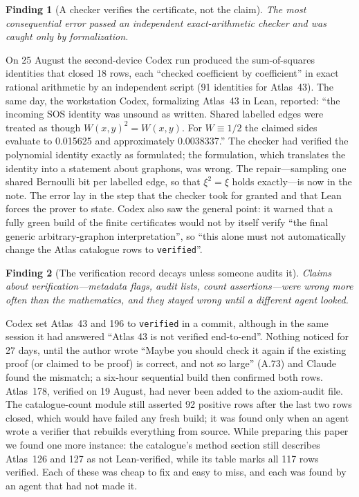 \documentclass[11pt,a4paper]{article}
\newtheorem{finding}{Finding}
\newcommand{\ttt}[1]{\texttt{#1}}
\begin{document}
\begin{finding}[A checker verifies the certificate, not the claim]\label{f:checker}
The most consequential error passed an independent exact-arithmetic checker and was caught only by
formalization.
\end{finding}
On 25 August the second-device Codex run produced the sum-of-squares identities that closed 18 rows, each
``checked coefficient by coefficient'' in exact rational arithmetic by an independent script (91 identities for
Atlas~43). The same day, the workstation Codex, formalizing Atlas~43 in Lean, reported: ``the incoming SOS
identity was unsound as written. Shared labelled edges were treated as though $W(x,y)^2 = W(x,y)$. For $W\equiv
1/2$ the claimed sides evaluate to 0.015625 and approximately 0.0038337.'' The checker had verified the
polynomial identity exactly as formulated; the formulation, which translates the identity into a statement
about graphons, was wrong. The repair---sampling one shared Bernoulli bit per labelled edge, so that
$\xi^2=\xi$ holds exactly---is now in the note. The error lay in the step that the checker took for granted and
that Lean forces the prover to state. Codex also saw the general point: it warned that a fully green build of
the finite certificates would not by itself verify ``the final generic arbitrary-graphon interpretation'', so
``this alone must not automatically change the Atlas catalogue rows to \ttt{verified}''.

\begin{finding}[The verification record decays unless someone audits it]\label{f:record}
Claims \emph{about} verification---metadata flags, audit lists, count assertions---were wrong more often
than the mathematics, and they stayed wrong until a different agent looked.
\end{finding}
Codex set Atlas~43 and 196 to \ttt{verified} in a commit, although in the same session it had answered
``Atlas 43 is not verified end-to-end''. Nothing noticed for 27 days, until the author wrote ``Maybe you should
check it again if the existing proof (or claimed to be proof) is correct, and not so large'' (A.73) and Claude
found the mismatch; a six-hour sequential build then confirmed both rows. Atlas~178, verified on 19 August, had
never been added to the axiom-audit file. The catalogue-count module still asserted 92 positive rows after the
last two rows closed, which would have failed any fresh build; it was found only when an agent wrote a verifier
that rebuilds everything from source. While preparing this paper we found one more instance: the catalogue's
method section still describes Atlas~126 and 127 as not Lean-verified, while its table marks all 117 rows
verified. Each of these was cheap to fix and easy to miss, and each was found by an agent that had not made it.
\end{document}
